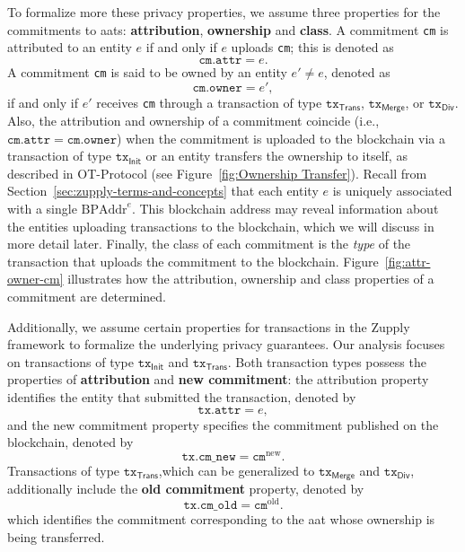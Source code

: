 To formalize more these privacy properties, we assume three properties for the commitments to \glspl{aat}: \textbf{attribution}, \textbf{ownership} and \textbf{class}. A commitment \texttt{cm} is attributed to an entity $e$ if and only if $e$ uploads \texttt{cm}; this is denoted as
\[
 \texttt{cm}.\texttt{attr} = e.
 \] 
A commitment \texttt{cm} is said to be owned by an entity $e' \neq e$, denoted as 
\[
\texttt{cm}.\texttt{owner} = e',
\]
 if and only if  $e'$ receives \texttt{cm} through a transaction of type $\texttt{tx}_\textsf{Trans}$, $\texttt{tx}_\textsf{Merge}$, or $\texttt{tx}_\textsf{Div}$. Also, the attribution and ownership of a commitment coincide (i.e., \( \texttt{cm}.\texttt{attr}  = \texttt{cm}.\texttt{owner}\)) when the commitment is uploaded to the blockchain via a transaction of type $\texttt{tx}_\textsf{Init}$ or an entity transfers the ownership to itself, as described in \textsf{OT-Protocol} (see Figure~\ref{fig:Ownership Transfer}). Recall from Section~\ref{sec:zupply-terms-and-concepts} that each entity $e$ is uniquely associated with a single $\text{BPAddr}^{e}$. This blockchain address may reveal information about the entities uploading transactions to the blockchain, which we will discuss in more detail later. Finally, the class of each commitment is the \textit{type} of the transaction that uploads the commitment to the blockchain.  Figure~\ref{fig:attr-owner-cm} illustrates how the attribution, ownership and class properties of a commitment are determined. 



Additionally, we assume certain properties for transactions in the Zupply framework to formalize the underlying privacy guarantees. Our analysis focuses on transactions of type $\texttt{tx}_\textsf{Init}$ and $\texttt{tx}_\textsf{Trans}$. Both transaction types possess the properties of \textbf{attribution} and \textbf{new commitment}: the attribution property identifies the entity that submitted the transaction, denoted by
\[
 \texttt{tx}.\texttt{attr} = e,
\]
and the new commitment property specifies the commitment published on the blockchain, denoted by
\[
 \texttt{tx}.\texttt{cm\_new} = \texttt{cm}^{\text{new}}.
 \]
Transactions of type $\texttt{tx}_\textsf{Trans}$,which can be generalized to $\texttt{tx}_\textsf{Merge}$ and $\texttt{tx}_\textsf{Div}$, additionally include the \textbf{old commitment} property, denoted by 
\[
\texttt{tx}.\texttt{cm\_old} = \texttt{cm}^{\text{old}}.
\]
which identifies the commitment corresponding to the \gls{aat} whose ownership is being transferred.


